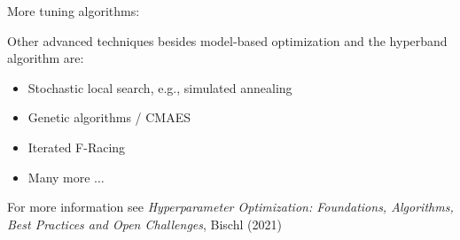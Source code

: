 \documentclass[11pt,compress,t,notes=noshow, xcolor=table]{beamer}
\begin{document}
% 
% 
% 
%   

\begin{frame}{More tuning algorithms:}

Other advanced techniques besides model-based optimization and the hyperband algorithm are: 
  
  \begin{itemize}
\item Stochastic local search, e.g., simulated annealing
\item Genetic algorithms / CMAES
\item Iterated F-Racing
\item Many more $\ldots$
  \end{itemize}

\medskip
For more information see \textit{Hyperparameter Optimization: Foundations, Algorithms,
Best Practices and Open Challenges}, Bischl (2021)

\end{frame}
\endlecture
\end{document}
